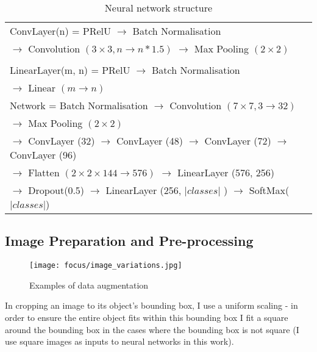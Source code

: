\begin{table}[h]
  \centering
    \caption{Neural network structure }
\begin{tabular}{ l } 

\toprule

 ConvLayer(n) = PRelU $\rightarrow$ Batch Normalisation \\ 
 $\rightarrow$  Convolution $(3\times3, n \rightarrow n * 1.5)$ $\rightarrow$  Max Pooling $(2\times2)$ \\
\\
 LinearLayer(m, n)  = PRelU $\rightarrow$ Batch Normalisation \\  $\rightarrow$  Linear $(m \rightarrow n)$ \\
\toprule
  Network = Batch Normalisation $\rightarrow$
 Convolution $(7\times7, 3 \rightarrow 32)$ \\
 $\rightarrow$ Max Pooling $(2\times2)$   \\

  $\rightarrow$ ConvLayer (32) $\rightarrow$  ConvLayer (48) $\rightarrow$ ConvLayer (72) $\rightarrow$ ConvLayer (96)   \\
  
  
  $\rightarrow$ Flatten $(2\times2\times144 \rightarrow 576)$ $\rightarrow$ LinearLayer (576, 256) \\
  
  $\rightarrow$ Dropout(0.5) $\rightarrow$ LinearLayer (256, $\vert classes \vert$ )  $\rightarrow$  SoftMax($\vert classes \vert$) \\
  
    
       
\toprule
\end{tabular}

\label{fig:focus_network}
\end{table}




\subsection {Image Preparation and Pre-processing}


\begin{figure*}[t]
    \caption{Examples of data augmentation }
\centering
\texttt{[image: focus/image\_variations.jpg]}
\label{fig:focus_variations}
\end{figure*}


In cropping an image to its object's bounding box, I use a uniform scaling - in order to ensure the entire object fits within this bounding box I fit a square around the bounding box in the cases where the bounding box is not square (I use square images as inputs to neural networks in this work).

